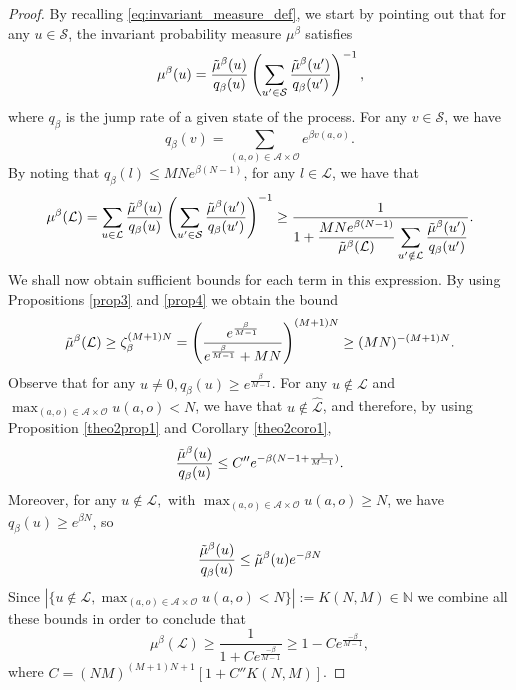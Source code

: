 \documentclass[11pt]{article}
\theoremstyle{definition}
\newcommand\ddfrac[2]{\frac{\displaystyle #1}{\displaystyle #2}}
\newcommand{\st}{\mathcal{S}}
\newcommand{\A}{\mathcal{A}}
\newcommand{\opn}{\mathcal{O}}
\begin{document}
\begin{proof}
    By recalling \eqref{eq:invariant_measure_def}, we start by pointing out that for any $u\in\st$, the invariant probability measure $\mu^\beta$ satisfies
    $$
        \mu^\beta(u)=\frac{\Tilde{\mu}^\beta(u)}{q_\beta(u)}\left( \sum_{u'\in\st}\frac{\Tilde{\mu}^\beta(u')}{q_\beta(u')} \right)^{-1},
    $$
    where $q_\beta$ is the jump rate of a given state of the process. For any $v\in\st$, we have
    $$
        q_\beta(v)=\sum_{(a,o)\in\mathcal{A}\times\mathcal{O}}e^{\beta v(a,o)}.
    $$
    By noting that $q_\beta(l)\leq MNe^{\beta(N-1)}$, for any $l\in \mathcal{L}$, we have that
    $$
        \mu^\beta(\mathcal{L})=\sum_{u\in\mathcal{L}}\frac{\Tilde{\mu}^\beta(u)}{q_\beta(u)}\left( \sum_{u'\in\st}\frac{\Tilde{\mu}^\beta(u')}{q_\beta(u')} \right)^{-1}\geq
        \ddfrac{1}{1+\frac{MNe^{\beta(N-1)}}{\Tilde{\mu}^\beta(\mathcal{L})}\sum_{u'\notin\mathcal{L}}\frac{\Tilde{\mu}^\beta(u')}{q_\beta(u')}}.
    $$
    We shall now obtain sufficient bounds for each term in this expression.
    By using Propositions \ref{prop3} and \ref{prop4} we obtain the bound
    $$
        \Tilde{\mu}^\beta(\mathcal{L})\geq\zeta^{(M+1)N}_\beta=\left(\frac{e^{\frac{\beta}{M-1}}}{e^{\frac{\beta}{M-1}}+MN} \right)^{(M+1)N}\geq (MN)^{-(M+1)N}.
    $$
    Observe that for any $u\neq 0, q_\beta(u)\geq e^{\frac{\beta}{M-1}}$.  For any $u\notin\mathcal{L}$ and $\max_{(a,o)\in \A\times \opn} u(a,o)< N$, we have that $u\notin\hat{\mathcal{L}}$, and therefore, by using Proposition \ref{theo2prop1} and Corollary \ref{theo2coro1},
    $$
    \frac{\Tilde{\mu}^\beta(u)}{q_\beta(u)}\leq C''e^{-\beta(N-1+\frac{1}{M-1})}. 
    $$
    Moreover, for any $u\notin\mathcal{L},$ with $\max_{(a,o)\in \A\times \opn} u(a,o)\geq N$, we have $q_\beta(u)\geq e^{\beta N}$, so
    $$
        \frac{\Tilde{\mu}^\beta(u)}{q_\beta(u)}\leq \Tilde{\mu}^\beta(u)e^{-\beta N}
    $$
    Since $|\{u\notin\mathcal{L},\max_{(a,o)\in \A\times \opn} u(a,o)< N\}|:=K(N,M)\in\mathbb{N}$ we combine all these bounds in order to conclude that
    $$
        \mu^\beta(\mathcal{L})\geq \frac{1}{1+Ce^{\frac{-\beta}{M-1}}}\geq 1-Ce^{\frac{-\beta}{M-1}},
    $$
    where $C=(NM)^{(M+1)N+1}[1+C''K(N,M)]$.
    

\end{proof}
\end{document}
